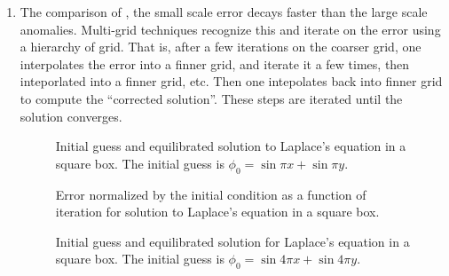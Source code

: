 \documentclass[11pt]{article}
\begin{document}
\begin{enumerate}[label=(\alph*)]
    \item  The comparison of , the small scale error decays faster than the large scale anomalies. Multi-grid techniques recognize this and iterate on the error using a hierarchy of grid.  That is, after a few iterations on the coarser grid, one interpolates the error into a finner grid, and iterate it a few times, then inteporlated into a finner grid, etc. Then one intepolates back into finner grid to compute the ``corrected solution''. These steps are iterated until the solution converges.


\begin{figure}[p]
\centerline{}
\caption{Initial guess and equilibrated solution to Laplace's equation in a square box. The initial guess is $\phi_0 = \sin \pi x + \sin \pi y$.}
    \label{sin_half}
\end{figure}

\begin{figure}[p]
\centerline{}
\caption{Error normalized by the initial condition as a function of iteration for solution to Laplace's equation in a square box.}
    \label{error}
\end{figure}



\begin{figure}[p]
\centerline{}
\caption{Initial guess and equilibrated solution for Laplace's equation in a square box. The initial guess is $\phi_0 = \sin 4\pi x + \sin 4\pi y$.}
    \label{sin_four}
\end{figure}



\end{enumerate}




\end{document}

